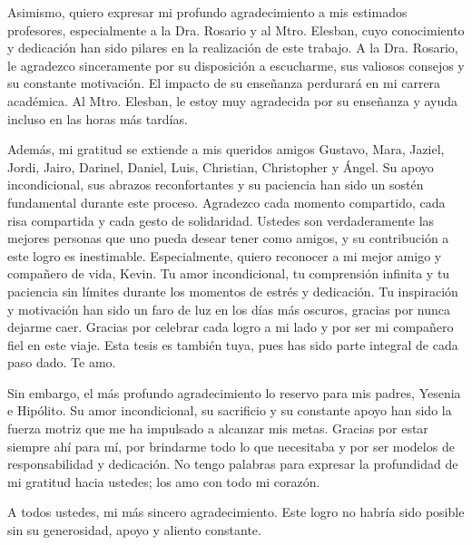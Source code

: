 Asimismo, quiero expresar mi profundo agradecimiento a mis estimados profesores, especialmente a la Dra. Rosario y al Mtro. Elesban, cuyo conocimiento y dedicación han sido pilares en la realización de este trabajo. A la Dra. Rosario, le agradezco sinceramente por su disposición a escucharme, sus valiosos consejos y su constante motivación. El impacto de su enseñanza perdurará en mi carrera académica. Al Mtro. Elesban, le estoy muy agradecida por su enseñanza y ayuda incluso en las horas más tardías.

Además, mi gratitud se extiende a mis queridos amigos Gustavo, Mara, Jaziel, Jordi, Jairo, Darinel, Daniel, Luis, Christian, Christopher y Ángel. Su apoyo incondicional, sus abrazos reconfortantes y su paciencia han sido un sostén fundamental durante este proceso. Agradezco cada momento compartido, cada risa compartida y cada gesto de solidaridad. Ustedes son verdaderamente las mejores personas que uno pueda desear tener como amigos, y su contribución a este logro es inestimable. Especialmente, quiero reconocer a mi mejor amigo y compañero de vida, Kevin. Tu amor incondicional, tu comprensión infinita y tu paciencia sin límites durante los momentos de estrés y dedicación. Tu inspiración y motivación han sido un faro de luz en los días más oscuros, gracias por nunca dejarme caer. Gracias por celebrar cada logro a mi lado y por ser mi compañero fiel en este viaje. Esta tesis es también tuya, pues has sido parte integral de cada paso dado. Te amo.

Sin embargo, el más profundo agradecimiento lo reservo para mis padres, Yesenia e Hipólito. Su amor incondicional, su sacrificio y su constante apoyo han sido la fuerza motriz que me ha impulsado a alcanzar mis metas. Gracias por estar siempre ahí para mí, por brindarme todo lo que necesitaba y por ser modelos de responsabilidad y dedicación. No tengo palabras para expresar la profundidad de mi gratitud hacia ustedes; los amo con todo mi corazón.

A todos ustedes, mi más sincero agradecimiento. Este logro no habría sido posible sin su generosidad, apoyo y aliento constante.
